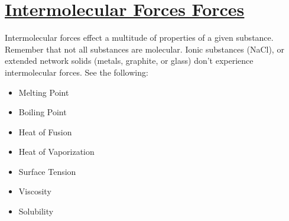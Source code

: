 \documentclass{article}
\begin{document}
\pagebreak
	
	\section*{\LARGE\uline{Intermolecular Forces Forces}}
	Intermolecular forces effect a multitude of properties of a given substance. Remember that not all substances are molecular. Ionic substances (NaCl), or extended network solids (metals, graphite, or glass) don't experience intermolecular forces. See the following:
\begin{qq}
		
\begin{center}
		
	\hspace{18pt}\begin{minipage}{0.2\textwidth}
	\begin{itemize}[leftmargin=*]
		\item Melting Point
		\item Boiling Point
	
	
	\end{itemize}
	\end{minipage}
		\hspace{10pt}\begin{minipage}{0.3\textwidth}
		\begin{itemize}[leftmargin=*]
			\item Heat of Fusion 
			\item Heat of Vaporization
		\end{itemize}
	\end{minipage}
	\begin{minipage}{0.22\textwidth}
	\begin{itemize}[leftmargin=*]
		\item Surface Tension 
		\item Viscosity	
	\end{itemize}
	\end{minipage}	
		\begin{minipage}{0.2\textwidth}
		\begin{itemize}[leftmargin=*]
			\item Solubility
		\end{itemize}
	\end{minipage}	
	
	
\end{center}
\end{qq}
	
	\renewcommand{\Tstrut}{\rule{0pt}{6ex}}         %
	\renewcommand{\Bstrut}{\rule[-4ex]{0pt}{0pt}}   %
	\renewcommand{\TBstrut}{\Tstrut\Bstrut}            %
	
\end{document}
